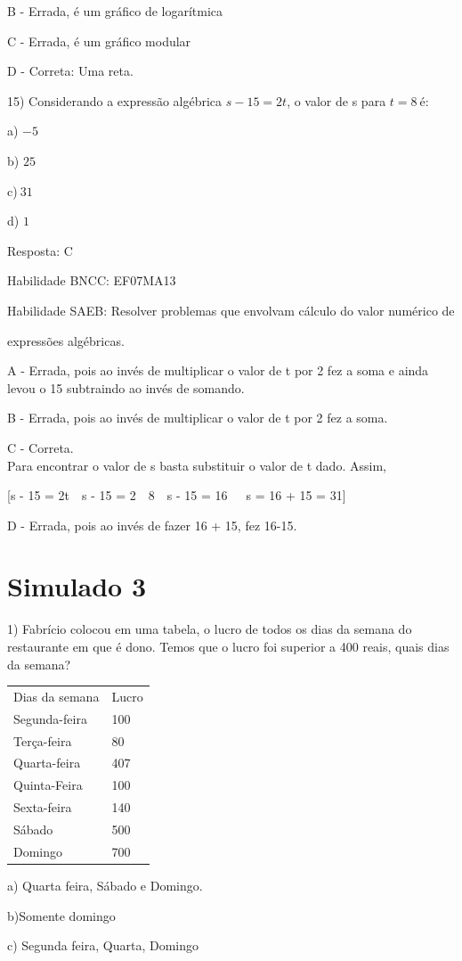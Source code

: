 B - Errada, é um gráfico de logarítmica

C - Errada, é um gráfico modular

D - Correta: Uma reta.

15) Considerando a expressão algébrica \(s - 15 = 2t\), o valor de s
para \(t = 8\ \)é:

a) \(- 5\)

b) \(25\)

c)\(\ 31\)

d) \(1\)

Resposta: C

Habilidade BNCC: EF07MA13

Habilidade SAEB: Resolver problemas que envolvam cálculo do valor
numérico de

expressões algébricas.

A - Errada, pois ao invés de multiplicar o valor de t por 2 fez a soma e
ainda levou o 15 subtraindo ao invés de somando.

B - Errada, pois ao invés de multiplicar o valor de t por 2 fez a soma.

C - Correta.\\
Para encontrar o valor de s basta substituir o valor de t dado. Assim,

[s - 15 = 2t\  \rightarrow \ s - 15 = 2\  \times \ 8\  \rightarrow \ s - 15 = 16\  \rightarrow \ \ s = 16 + 15 = 31]

D - Errada, pois ao invés de fazer 16 + 15, fez 16-15.

\section{Simulado 3}

1) Fabrício colocou em uma tabela, o lucro de todos os dias da semana do
restaurante em que é dono. Temos que o lucro foi superior a 400 reais,
quais dias da semana?

\begin{longtable}[]{@{}ll@{}}
\toprule
\endhead
Dias da semana & Lucro\tabularnewline
Segunda-feira & 100\tabularnewline
Terça-feira & 80\tabularnewline
Quarta-feira & 407\tabularnewline
Quinta-Feira & 100\tabularnewline
Sexta-feira & 140\tabularnewline
Sábado & 500\tabularnewline
Domingo & 700\tabularnewline
\bottomrule
\end{longtable}

a) Quarta feira, Sábado e Domingo.

b)Somente domingo

c) Segunda feira, Quarta, Domingo

